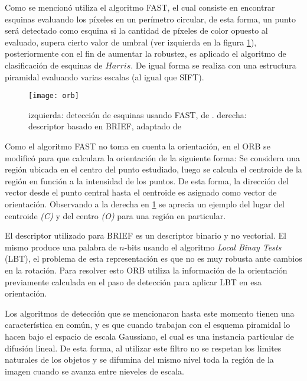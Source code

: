 Como se mencionó utiliza el algoritmo FAST, el cual consiste en encontrar esquinas evaluando los píxeles en un perímetro circular, de esta forma, un punto será detectado como esquina si la cantidad de píxeles de color opuesto al evaluado, supera cierto valor de umbral (ver izquierda en la figura \ref{imagen:orb}), posteriormente con el fin de aumentar la robustez, es aplicado el algoritmo de clasificación de esquinas de $Harris$. De igual forma se realiza con una estructura piramidal evaluando varias escalas (al igual que SIFT).

\begin{figure}[H]
	\centering
	\texttt{[image: orb]}
	\caption[Detector y descriptor ORB]{izquierda: detección de esquinas usando FAST, de \cite{fast}. derecha: descriptor basado en BRIEF, adaptado de\protect\footnotemark }
	\label{imagen:orb}
\end{figure}

Como el algoritmo FAST no toma en cuenta la orientación, en el ORB se modificó para que calculara la orientación de la siguiente forma: Se considera una región ubicada en el centro del punto estudiado, luego se calcula el centroide de la región en función a la intensidad de los puntos. De esta forma, la dirección del vector desde el punto central  hasta el centroide es asignado como vector de orientación. Observando a la derecha en \ref{imagen:orb} se aprecia un ejemplo del lugar del centroide \textit{(C)} y del centro \textit{(O)} para una región en particular.

El descriptor utilizado para BRIEF es un descriptor binario y no vectorial. El mismo produce una palabra de $n$-bits usando el algoritmo \textit{Local Binay Tests} (LBT), el problema de esta representación es que no es muy robusta ante cambios en la rotación. Para resolver esto ORB utiliza la información de la orientación previamente calculada en el paso de detección para aplicar LBT en esa orientación.

Los algoritmos de detección que se mencionaron hasta este momento tienen una característica en común, y es que cuando trabajan con el esquema piramidal lo hacen bajo el espacio de escala Gaussiano, el cual es una instancia particular de difusión lineal. De esta forma, al utilizar este filtro no se respetan los limites naturales de los objetos y se difumina del mismo nivel toda la región de la imagen cuando se avanza entre nieveles de escala.

